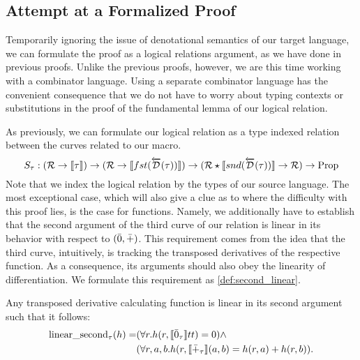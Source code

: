\subsection{Attempt at a Formalized Proof}\label{sec:combinator-proof}
  Temporarily ignoring the issue of denotational semantics of our target language, we can formulate the proof as a logical relations argument, as we have done in previous proofs.
  Unlike the previous proofs, however, we are this time working with a combinator language.
  Using a separate combinator language has the convenient consequence that we do not have to worry about typing contexts or substitutions in the proof of the fundamental lemma of our logical relation.

  As previously, we can formulate our logical relation as a type indexed relation between the curves related to our macro.
  \begin{equation*}
    S_\tau : (\mathcal{R} \rightarrow \llbracket \tau \rrbracket) \rightarrow
      (\mathcal{R} \rightarrow \llbracket fst (\overleftarrow{\mathcal{D}}(\tau)) \rrbracket) \rightarrow
      (\mathcal{R} \star \llbracket snd(\overleftarrow{\mathcal{D}}(\tau)) \rrbracket \rightarrow \mathcal{R}) \rightarrow \text{Prop}
  \end{equation*}
  Note that we index the logical relation by the types of our source language.
  The most exceptional case, which will also give a clue as to where the difficulty with this proof lies, is the case for functions.
  Namely, we additionally have to establish that the second argument of the third curve of our relation is linear in its behavior with respect to $(\bar{0}, \bar{+})$.
  This requirement comes from the idea that the third curve, intuitively, is tracking the transposed derivatives of the respective function.
  As a consequence, its arguments should also obey the linearity of differentiation. We formulate this requirement as \cref{def:second_linear}.

  \begin{definition}\label{def:second_linear}
    Any transposed derivative calculating function is linear in its second argument such that it follows:
    \begin{align*}
      \text{linear\_second}_\tau(h) =& (\forall r. h(r, \llbracket \bar{0}_\tau \rrbracket tt) = 0) \wedge \\ & (\forall r, a, b. h(r, \llbracket \bar{+}_\tau \rrbracket (a, b) = h (r, a) + h (r, b)).
    \end{align*}
  \end{definition}

